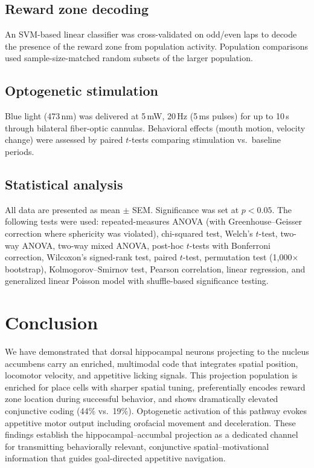 \documentclass[11pt]{article}
\begin{document}
\subsection{Reward zone decoding}
An SVM-based linear classifier was cross-validated on odd/even laps to decode the presence of the reward zone from population activity. Population comparisons used sample-size-matched random subsets of the larger population.

\subsection{Optogenetic stimulation}
Blue light (473\,nm) was delivered at 5\,mW, 20\,Hz (5\,ms pulses) for up to 10\,s through bilateral fiber-optic cannulas. Behavioral effects (mouth motion, velocity change) were assessed by paired $t$-tests comparing stimulation vs.\ baseline periods.

\subsection{Statistical analysis}
All data are presented as mean $\pm$ SEM. Significance was set at $p<0.05$. The following tests were used: repeated-measures ANOVA (with Greenhouse--Geisser correction where sphericity was violated), chi-squared test, Welch's $t$-test, two-way ANOVA, two-way mixed ANOVA, post-hoc $t$-tests with Bonferroni correction, Wilcoxon's signed-rank test, paired $t$-test, permutation test (1,000$\times$ bootstrap), Kolmogorov--Smirnov test, Pearson correlation, linear regression, and generalized linear Poisson model with shuffle-based significance testing.

\section{Conclusion}

We have demonstrated that dorsal hippocampal neurons projecting to the nucleus accumbens carry an enriched, multimodal code that integrates spatial position, locomotor velocity, and appetitive licking signals. This projection population is enriched for place cells with sharper spatial tuning, preferentially encodes reward zone location during successful behavior, and shows dramatically elevated conjunctive coding (44\% vs.\ 19\%). Optogenetic activation of this pathway evokes appetitive motor output including orofacial movement and deceleration. These findings establish the hippocampal--accumbal projection as a dedicated channel for transmitting behaviorally relevant, conjunctive spatial--motivational information that guides goal-directed appetitive navigation.
\end{document}
